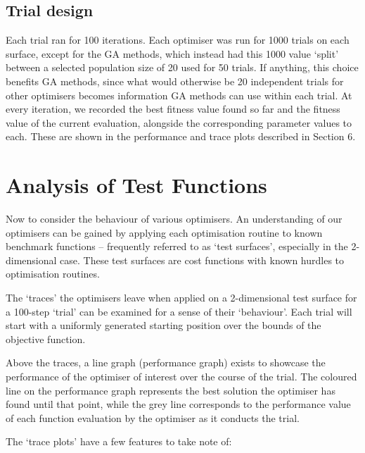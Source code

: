 \documentclass[
  a4paper,
]{article}
\newcommand{\+}{\phantom{-}}
\begin{document}
\subsection{Trial design}\label{trial-design}

Each trial ran for 100 iterations. Each optimiser was run for 1000
trials on each surface, except for the GA methods, which instead had
this 1000 value `split' between a selected population size of 20 used
for 50 trials. If anything, this choice benefits GA methods, since what
would otherwise be 20 independent trials for other optimisers becomes
information GA methods can use within each trial. At every iteration, we
recorded the best fitness value found so far and the fitness value of
the current evaluation, alongside the corresponding parameter values to
each. These are shown in the performance and trace plots described in
Section 6.

\newpage

\section{Analysis of Test Functions}\label{analysis-of-test-functions}

Now to consider the behaviour of various optimisers. An understanding of
our optimisers can be gained by applying each optimisation routine to
known benchmark functions -- frequently referred to as `test surfaces',
especially in the 2-dimensional case. These test surfaces are cost
functions with known hurdles to optimisation routines.

The `traces' the optimisers leave when applied on a 2-dimensional test
surface for a 100-step `trial' can be examined for a sense of their
`behaviour'. Each trial will start with a uniformly generated starting
position over the bounds of the objective function.

Above the traces, a line graph (performance graph) exists to showcase
the performance of the optimiser of interest over the course of the
trial. The coloured line on the performance graph represents the best
solution the optimiser has found until that point, while the grey line
corresponds to the performance value of each function evaluation by the
optimiser as it conducts the trial.

The `trace plots' have a few features to take note of:
\end{document}

